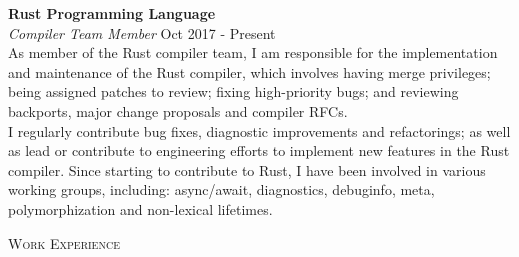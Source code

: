 \documentclass[a4paper]{article}
\newcommand{\lineunder} {
  \vspace*{-8pt} \\
  \hspace*{-18pt} \hrulefill \\
}
\newcommand{\header} [1] {
  {\hspace*{-18pt}\vspace*{6pt} \textsc{#1}}
  \vspace*{-6pt} \lineunder
}
\begin{document}
\textbf{Rust Programming Language} \\
\textit{Compiler Team Member} \hfill {\color{gray} Oct 2017 - Present} \\
\vspace{2mm}
As member of the Rust compiler team, I am responsible for the implementation and maintenance of
the Rust compiler, which involves having merge privileges; being assigned patches to review;
fixing high-priority bugs; and reviewing backports, major change proposals and compiler RFCs. \\
\vspace{2mm}
I regularly contribute bug fixes, diagnostic improvements and refactorings; as
well as lead or contribute to engineering efforts to implement new features in the Rust compiler.
Since starting to contribute to Rust, I have been involved in various working groups, including:
async/await, diagnostics, debuginfo, meta, polymorphization and non-lexical lifetimes.
\vspace{2mm}

\header{Work Experience}
\vspace{1mm}
\end{document}
